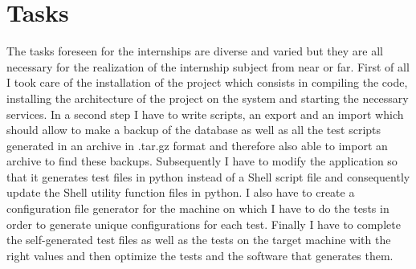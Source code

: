 \section{Tasks}
The tasks foreseen for the internships are diverse and varied but they
are all necessary for the realization of the internship subject from near or far.
\newline
\newline
First of all I took care of the installation of the project which 
consists in compiling the code, installing the architecture of the
project on the system and starting the necessary services.
\newline
\newline
In a second step I have to write scripts, an export and an import which should allow
to make a backup of the database as well as all the test scripts generated in an archive
in .tar.gz format and therefore also able to import an archive to find these backups.
\newline
\newline
Subsequently I have to modify the application so that it generates test files in python
instead of a Shell script file and consequently update the Shell utility function files
in python.
\newline
\newline
I also have to create a configuration file generator for the machine on which I have to
do the tests in order to generate unique configurations for each test.
\newline
\newline
Finally I have to complete the self-generated test files as well as the tests on the target
machine with the right values and then optimize the tests and the software that generates them.